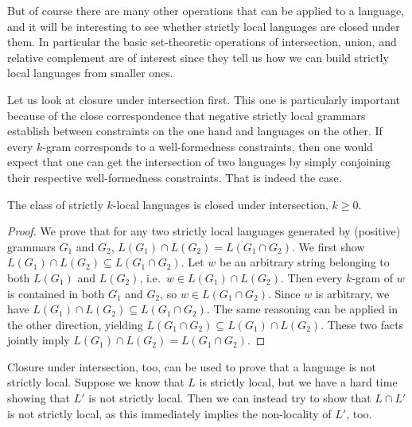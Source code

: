But of course there are many other operations that can be applied to a language, and it will be interesting to see whether strictly local languages are closed under them.
In particular the basic set-theoretic operations of intersection, union, and relative complement are of interest since they tell us how we can build strictly local languages from smaller ones.

Let us look at closure under intersection first.
This one is particularly important because of the close correspondence that negative strictly local grammars establish between constraints on the one hand and languages on the other.
If every $k$-gram corresponds to a well-formedness constraints, then one would expect that one can get the intersection of two languages by simply conjoining their respective well-formedness constraints.
That is indeed the case.
%
\begin{lemma}
    The class of strictly $k$-local languages is closed under intersection, $k \geq 0$.
\end{lemma}
%
\begin{proof}
    We prove that for any two strictly local languages generated by (positive) grammars $G_1$ and $G_2$, $L(G_1) \cap L(G_2) = L(G_1 \cap G_2)$.
    We first show $L(G_1) \cap L(G_2) \subseteq L(G_1 \cap G_2)$.
    Let $w$ be an arbitrary string belonging to both $L(G_1)$ and $L(G_2)$, i.e.\ $w \in L(G_1) \cap L(G_2)$.
    Then every $k$-gram of $w$ is contained in both $G_1$ and $G_2$, so $w \in L(G_1 \cap G_2)$.
    Since $w$ is arbitrary, we have $L(G_1) \cap L(G_2) \subseteq L(G_1 \cap G_2)$.
    The same reasoning can be applied in the other direction, yielding $L(G_1 \cap G_2) \subseteq L(G_1) \cap L(G_2)$.
    These two facts jointly imply $L(G_1) \cap L(G_2) = L(G_1 \cap G_2)$.
\end{proof}
%
%
Closure under intersection, too, can be used to prove that a language is not strictly local.
Suppose we know that $L$ is strictly local, but we have a hard time showing that $L'$ is not strictly local.
Then we can instead try to show that $L \cap L'$ is not strictly local, as this immediately implies the non-locality of $L'$, too.
%

